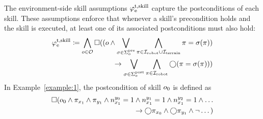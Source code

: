 The environment-side skill assumptions $\varphi_\textrm{e}^\textrm{t,skill}$ capture the postconditions of each skill. These assumptions enforce that whenever a skill’s precondition holds and the skill is executed, at least one of its associated postconditions must also hold:
\begin{equation}
\begin{aligned}
    \varphi_\textrm{e}^\textrm{t,skill} \coloneqq \bigwedge_{o \in \mathcal{O}} 
\square
((o 
    \land
    \bigvee_{\sigma\in\Sigma_{o}^{\textrm{pre}}}
    \bigwedge_{\pi\in {\mathcal I}_{\textrm{robot}} \cup {\mathcal I}_{\textrm{terrain}}} \pi=\sigma(\pi))\\
    \to
    \bigvee_{\sigma\in\Sigma_{o}^{\textrm{post}}} 
    \bigwedge_{\pi \in {\mathcal I}_{\textrm{robot}}}
    {\bigcirc (\pi=\sigma(\pi))} 
    )
\end{aligned}
\end{equation}
%
In Example~\ref{example:1},
the postcondition of skill $o_{0}$
is defined as
\begin{equation}
\begin{aligned}
    \square (o_{0} 
     \land \pi_{x_1} \land \pi_{y_1} \land n_{x_1}^{y_0} = 1 \land n_{x_1}^{y_1} = 1 \land n_{x_1}^{y_2} = 1 \land \dots \\
    \to \bigcirc \pi_{x_0} \land \bigcirc \pi_{y_1} \land \neg \dots)
\end{aligned}
\end{equation}
